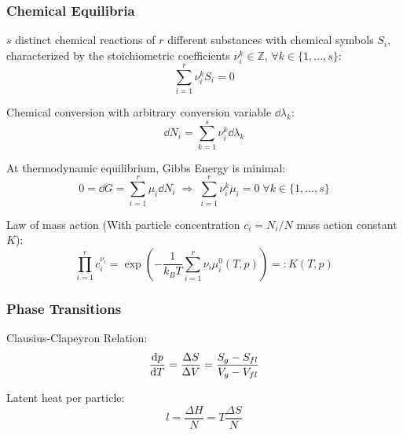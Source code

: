 		\subsubsection{Chemical Equilibria}
			\noindent
			$s$ distinct chemical reactions of $r$ different substances with chemical symbols $S_i$, characterized by the stoichiometric coefficients $\nu_i^k\in\mathbb{Z}$, $\forall k\in\lbrace1,...,s\rbrace$:
			\begin{equation}
				\sum_{i=1}^r \nu_i^k S_i = 0
			\end{equation}

			\noindent
			Chemical conversion with arbitrary conversion variable $\dd \lambda_k$:
			\begin{equation}
				\dd N_i = \sum_{k=1}^s \nu_i^k \dd \lambda_k
			\end{equation}

			\noindent
			At thermodynamic equilibrium, Gibbs Energy is minimal:
			\begin{equation}
					0 = \dd G = \sum_{i=1}^r \mu_i \dd N_i \;\Rightarrow\; \sum_{i=1}^r \nu_i^k \mu_i = 0 \;\forall k\in\lbrace1,...,s\rbrace
			\end{equation}

			\noindent
			Law of mass action (With particle concentration $c_i = N_i/N$ mass action constant $K$):
			\begin{equation}
				\prod_{i=1}^r	c_i^{\nu_i} = \exp\left( -\frac{1}{k_B T}\sum_{i=1}^r \nu_i\mu_i^0(T,p) \right) =: K(T,p)
			\end{equation}

		\subsubsection{Phase Transitions}
			\noindent
			Clausius-Clapeyron Relation:
			\begin{equation}
				\frac{\dd p}{\dd T} = \frac{\Delta S}{\Delta V} = \frac{S_g - S_{fl}}{V_g - V_{fl}}
			\end{equation}

			\noindent
			Latent heat per particle:
			\begin{equation}
				l = \frac{\Delta H}{N} = T\frac{\Delta S}{N}
			\end{equation}


